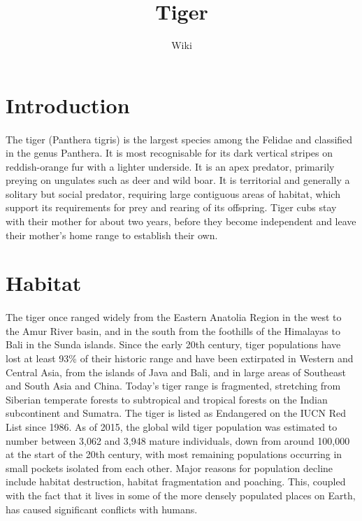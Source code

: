 \documentclass[12pt]{article}
\title{Tiger}
\author{Wiki}
\date{}
\begin{document}
    \maketitle
    \tableofcontents
    \pagebreak

    \section{Introduction}
    \paragraph{}
    The tiger  (Panthera tigris)  is the largest species among the Felidae and classified in the genus Panthera. It is most recognisable for its dark vertical stripes on reddish-orange fur with a lighter underside. It is an apex predator, primarily preying on ungulates such as deer and wild boar. It is territorial and generally a solitary but social predator, requiring large contiguous areas of habitat, which support its requirements for prey and rearing of its offspring. Tiger cubs stay with their mother for about two years, before they become independent and leave their mother's home range to establish their own.

    \section{Habitat}
    \paragraph{}
    The tiger once ranged widely from the Eastern Anatolia Region in the west to the Amur River basin, and in the south from the foothills of the Himalayas to Bali in the Sunda islands. Since the early 20th century, tiger populations have lost at least 93\% of their historic range and have been extirpated in Western and Central Asia, from the islands of Java and Bali, and in large areas of Southeast and South Asia and China. Today's tiger range is fragmented, stretching from Siberian temperate forests to subtropical and tropical forests on the Indian  subcontinent and Sumatra. The tiger is listed as Endangered on the IUCN Red List since 1986. As of 2015, the global wild tiger population was estimated to number between 3,062 and 3,948 mature individuals, down from around 100,000 at the start of the 20th century, with most remaining populations occurring in small pockets isolated from each other. Major reasons for population decline include habitat destruction, habitat fragmentation and poaching. This, coupled with the fact that it lives in some of the more densely populated places on Earth, has caused significant conflicts with humans.
\end{document}
